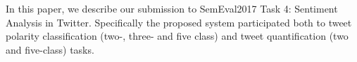 In this paper, we describe our submission to SemEval2017 Task 4: Sentiment Analysis in Twitter. Specifically the proposed system participated both to tweet polarity classification (two-, three- and five class) and tweet quantification (two and five-class) tasks.
